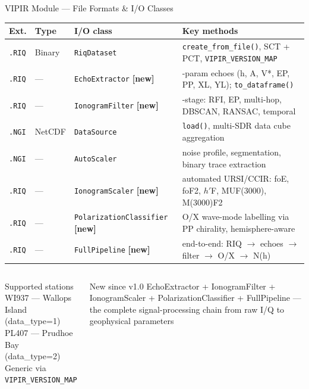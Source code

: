 \documentclass[aspectratio=169,11pt]{beamer}
\begin{document}
\begin{frame}{VIPIR Module — File Formats \& I/O Classes}
\vspace{-0.1cm}
\begin{center}
\scriptsize
\begin{tabular}{lll>{\raggedright\arraybackslash}p{5.2cm}}
  \toprule
  \textbf{Ext.} & \textbf{Type} & \textbf{I/O class} & \textbf{Key methods} \\
  \midrule
  \texttt{.RIQ} & Binary & \texttt{RiqDataset} &
    \texttt{create\_from\_file()}, SCT + PCT, \texttt{VIPIR\_VERSION\_MAP} \\
  \texttt{.RIQ} & — & \texttt{EchoExtractor} \textbf{[new]} &
    7-param echoes (h, A, V*, EP, PP, XL, YL); \texttt{to\_dataframe()} \\
  \texttt{.RIQ} & — & \texttt{IonogramFilter} \textbf{[new]} &
    6-stage: RFI, EP, multi-hop, DBSCAN, RANSAC, temporal \\
  \texttt{.NGI} & NetCDF & \texttt{DataSource} &
    \texttt{load()}, multi-SDR data cube aggregation \\
  \texttt{.NGI} & — & \texttt{AutoScaler} &
    noise profile, segmentation, binary trace extraction \\
  \texttt{.RIQ} & — & \texttt{IonogramScaler} \textbf{[new]} &
    automated URSI/CCIR: foE, foF2, $h'$F, MUF(3000), M(3000)F2 \\
  \texttt{.RIQ} & — & \texttt{PolarizationClassifier} \textbf{[new]} &
    O/X wave-mode labelling via PP chirality, hemisphere-aware \\
  \texttt{.RIQ} & — & \texttt{FullPipeline} \textbf{[new]} &
    end-to-end: RIQ $\to$ echoes $\to$ filter $\to$ O/X $\to$ N(h) \\
  \bottomrule
\end{tabular}
\end{center}
\vspace{0.15cm}
\begin{columns}
  \begin{block}{\small Supported stations}
    \scriptsize
    WI937 — Wallops Island (data\_type=1)\\
    PL407 — Prudhoe Bay (data\_type=2)\\
    Generic via \texttt{VIPIR\_VERSION\_MAP}
  \end{block}
  \begin{alertblock}{\small New since v1.0}
    \scriptsize
    EchoExtractor + IonogramFilter + IonogramScaler +
    PolarizationClassifier + FullPipeline —
    the complete signal-processing chain from raw I/Q
    to geophysical parameters
  \end{alertblock}
\end{columns}
\end{frame}
\end{document}
